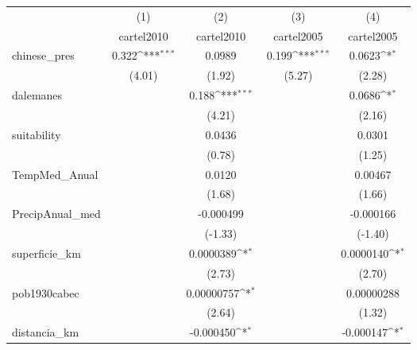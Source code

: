 {
\def\sym#1{\ifmmode^{#1}\else\(^{#1}\)\fi}
\begin{tabular}{l*{4}{c}}
\hline\hline
            &\multicolumn{1}{c}{(1)}&\multicolumn{1}{c}{(2)}&\multicolumn{1}{c}{(3)}&\multicolumn{1}{c}{(4)}\\
            &\multicolumn{1}{c}{cartel2010}&\multicolumn{1}{c}{cartel2010}&\multicolumn{1}{c}{cartel2005}&\multicolumn{1}{c}{cartel2005}\\
\hline
chinese\_pres&       0.322\sym{***}&      0.0989         &       0.199\sym{***}&      0.0623\sym{*}  \\
            &      (4.01)         &      (1.92)         &      (5.27)         &      (2.28)         \\
[1em]
dalemanes   &                     &       0.188\sym{***}&                     &      0.0686\sym{*}  \\
            &                     &      (4.21)         &                     &      (2.16)         \\
[1em]
suitability &                     &      0.0436         &                     &      0.0301         \\
            &                     &      (0.78)         &                     &      (1.25)         \\
[1em]
TempMed\_Anual&                     &      0.0120         &                     &     0.00467         \\
            &                     &      (1.68)         &                     &      (1.66)         \\
[1em]
PrecipAnual\_med&                     &   -0.000499         &                     &   -0.000166         \\
            &                     &     (-1.33)         &                     &     (-1.40)         \\
[1em]
superficie\_km&                     &   0.0000389\sym{*}  &                     &   0.0000140\sym{*}  \\
            &                     &      (2.73)         &                     &      (2.70)         \\
[1em]
pob1930cabec&                     &  0.00000757\sym{*}  &                     &  0.00000288         \\
            &                     &      (2.64)         &                     &      (1.32)         \\
[1em]
distancia\_km&                     &   -0.000450\sym{*}  &                     &   -0.000147\sym{*}  \\

\end{tabular}}
